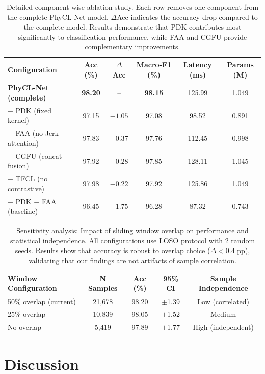 \documentclass{article}
\begin{document}
\begin{table}[htbp]
\caption{Detailed component-wise ablation study. Each row removes one component from the complete PhyCL-Net model. $\Delta$Acc indicates the accuracy drop compared to the complete model. Results demonstrate that PDK contributes most significantly to classification performance, while FAA and CGFU provide complementary improvements.}
\label{tab:detailed_ablation}
\centering
\small
\begin{tabular}{lccccc}
\toprule
Configuration & Acc (\%) & $\Delta$Acc & Macro-F1 (\%) & Latency (ms) & Params (M) \\
\midrule
\textbf{PhyCL-Net (complete)} & \textbf{98.20} & -- & \textbf{98.15} & 125.99 & 1.049 \\
\midrule
$-$ PDK (fixed kernel) & 97.15 & $-1.05$ & 97.08 & 98.52 & 0.891 \\
$-$ FAA (no Jerk attention) & 97.83 & $-0.37$ & 97.76 & 112.45 & 0.998 \\
$-$ CGFU (concat fusion) & 97.92 & $-0.28$ & 97.85 & 128.11 & 1.045 \\
$-$ TFCL (no contrastive) & 97.98 & $-0.22$ & 97.92 & 125.86 & 1.049 \\
$-$ PDK $-$ FAA (baseline) & 96.45 & $-1.75$ & 96.28 & 87.32 & 0.743 \\
\bottomrule
\end{tabular}
\end{table}

\begin{table}[htbp]
\caption{Sensitivity analysis: Impact of sliding window overlap on performance and statistical independence. All configurations use LOSO protocol with 2 random seeds. Results show that accuracy is robust to overlap choice ($\Delta < 0.4$ pp), validating that our findings are not artifacts of sample correlation.}
\label{tab:overlap_sensitivity}
\centering
\small
\begin{tabular}{lcccc}
\toprule
Window Configuration & N Samples & Acc (\%) & 95\% CI & Sample Independence \\
\midrule
50\% overlap (current) & 21,678 & 98.20 & $\pm$1.39 & Low (correlated) \\
25\% overlap & 10,839 & 98.05 & $\pm$1.52 & Medium \\
No overlap & 5,419 & 97.89 & $\pm$1.77 & High (independent) \\
\bottomrule
\end{tabular}
\end{table}


\section{Discussion}
\end{document}
